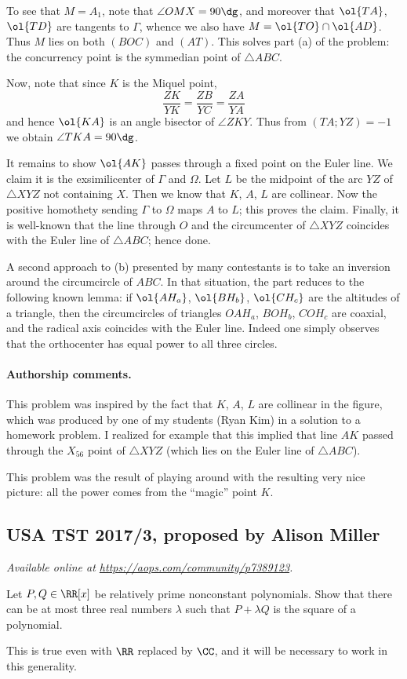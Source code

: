 \documentclass[11pt]{scrartcl}
\begin{document}
To see that $M = A_1$, note that $\angle OMX = 90\dg$,
and moreover that $\ol{TA}$, $\ol{TD}$ are tangents to $\Gamma$,
whence we also have $M = \ol{TO} \cap \ol{AD}$.
Thus $M$ lies on both $(BOC)$ and $(AT)$.
This solves part (a) of the problem:
the concurrency point is the symmedian point of $\triangle ABC$.

Now, note that since $K$ is the Miquel point,
\[ \frac{ZK}{YK} = \frac{ZB}{YC} = \frac{ZA}{YA} \]
and hence $\ol{KA}$ is an angle bisector of $\angle ZKY$.
Thus from $(TA;YZ)=-1$ we obtain $\angle TKA = 90\dg$.

It remains to show $\ol{AK}$ passes through a fixed point on the Euler line.
We claim it is the exsimilicenter of $\Gamma$ and $\Omega$.
Let $L$ be the midpoint of the arc $YZ$ of $\triangle XYZ$ not containing $X$.
Then we know that $K$, $A$, $L$ are collinear.
Now the positive homothety sending $\Gamma$ to $\Omega$ maps $A$ to $L$;
this proves the claim.
Finally, it is well-known that the line through $O$
and the circumcenter of $\triangle XYZ$
coincides with the Euler line of $\triangle ABC$;
hence done.

A second approach to (b) presented by many contestants
is to take an inversion around the circumcircle of $ABC$.
In that situation, the part reduces to the following
known lemma: if $\ol{AH_a}$, $\ol{BH_b}$, $\ol{CH_c}$
are the altitudes of a triangle,
then the circumcircles of triangles $OAH_a$, $BOH_b$, $COH_c$
are coaxial, and the radical axis coincides with the Euler line.
Indeed one simply observes that the orthocenter
has equal power to all three circles.

\paragraph{Authorship comments.}
This problem was inspired by the fact that $K$, $A$, $L$
are collinear in the figure,
which was produced by one of my students (Ryan Kim)
in a solution to a homework problem.
I realized for example that this implied that line $AK$
passed through the $X_{56}$ point of $\triangle XYZ$
(which lies on the Euler line of $\triangle ABC$).

This problem was the result of playing around with
the resulting very nice picture:
all the power comes from the ``magic'' point $K$.
\pagebreak

\subsection{USA TST 2017/3, proposed by Alison Miller}
\textsl{Available online at \url{https://aops.com/community/p7389123}.}
\begin{mdframed}[style=mdpurplebox,frametitle={Problem statement}]
Let $P, Q \in \RR[x]$ be relatively prime nonconstant polynomials.
Show that there can be at most three real numbers $\lambda$
such that $P + \lambda Q$ is the square of a polynomial.
\end{mdframed}
This is true even with $\RR$ replaced by $\CC$,
and it will be necessary to work in this generality.
\end{document}
